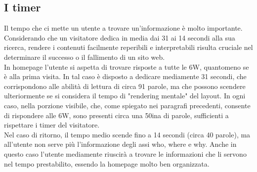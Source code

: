 \subsection{I timer}
Il tempo che ci mette un utente a trovare un'informazione è molto importante. Considerando che un visitatore dedica in media dai 31 ai 14 secondi alla sua ricerca, rendere i contenuti facilmente reperibili e interpretabili risulta cruciale nel determinare il successo o il fallimento di un sito web.\\
In homepage l'utente si aspetta di trovare risposte a tutte le 6W, quantomeno se è alla prima visita. In tal caso è disposto a dedicare mediamente 31 secondi, che corrispondono alle abilità di lettura di circa 91 parole, ma che possono scendere ulteriormente se si considera il tempo di "rendering mentale" del layout. In ogni caso, nella porzione visibile, che, come spiegato nei paragrafi precedenti, consente di rispondere alle 6W, sono presenti circa una 50ina di parole, sufficienti a rispettare i timer del visitatore.\\
Nel caso di ritorno, il tempo medio scende fino a 14 secondi (circa 40 parole), ma all'utente non serve più l'informazione degli assi who, where e why. Anche in questo caso l'utente mediamente riuscirà a trovare le informazioni che li servono nel tempo prestabilito, essendo la homepage molto ben organizzata.